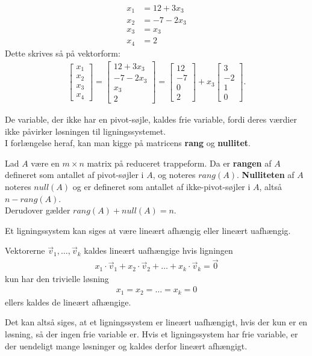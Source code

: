 \begin{eks}
\begin{align*}
x_1 &= 12 + 3x_3 \\
x_2 &= -7 - 2x_3 \\
x_3 &= x_3 \\
x_4 &= 2
\end{align*}
Dette skrives så på vektorform:
\begin{align*}
\begin{bmatrix}
x_1 \\
x_2 \\
x_3 \\
x_4 
\end{bmatrix}
= \begin{bmatrix}
12 + 3x_3 \\
-7 - 2x_3 \\
x_3 \\
2
\end{bmatrix}
= \begin{bmatrix}
12 \\
-7 \\
0 \\
2
\end{bmatrix}
+ x_3 \begin{bmatrix}
3 \\
-2 \\
1 \\
0
\end{bmatrix}.
\end{align*}
\end{eks}

De variable, der ikke har en pivot-søjle, kaldes frie variable, fordi deres værdier ikke påvirker løsningen til ligningssystemet. \\

I forlængelse heraf, kan man kigge på matricens \textbf{rang} og \textbf{nullitet}. 
\begin{defn}
Lad $A$ være en $m \times n$ matrix på reduceret trappeform. 
Da er \textbf{rangen} af $A$ defineret som antallet af pivot-søjler i $A$, og noteres $rang(A)$. 
\textbf{Nulliteten} af $A$ noteres $null(A)$ og er defineret som antallet af ikke-pivot-søjler i $A$, altså $n - rang(A)$. \\
Derudover gælder $rang(A) + null(A) = n$.
\end{defn}


Et ligningssystem kan siges at være lineært afhængig eller lineært uafhængig.

\begin{defn}
Vektorerne $\vec{v}_1, \dots ,\vec{v}_k$ kaldes lineært uafhængige hvis ligningen
\begin{align*}
x_1 \cdot \vec{v}_1+x_2 \cdot \vec{v}_2 + \dots + x_k \cdot \vec{v}_k =  \vec{0}
\end{align*}
kun har den trivielle løsning
\begin{align*}
x_1=x_2= \dots =x_k=0
\end{align*}
ellers kaldes de lineært afhængige.
\label{defn_lin_uafh}
\end{defn}

Det kan altså siges, at et ligningssystem er lineært uafhængigt, hvis der kun er en løsning, så der ingen frie variable er. Hvis et ligningssystem har frie variable, er der uendeligt mange løsninger og kaldes derfor lineært afhængigt. 



